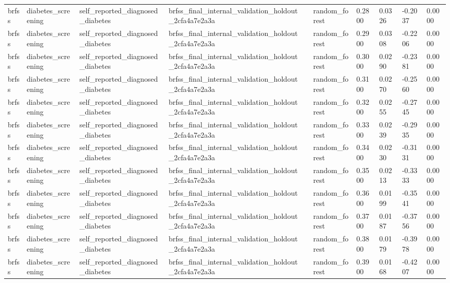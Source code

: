 \begin{tabular}{llllllllll}
brfss & diabetes\_screening & self\_reported\_diagnosed\_diabetes & brfss\_final\_internal\_validation\_holdout\_2cfa4a7e2a3a &  & random\_forest & 0.2800 & 0.0326 & -0.2037 & 0.0000 \\
brfss & diabetes\_screening & self\_reported\_diagnosed\_diabetes & brfss\_final\_internal\_validation\_holdout\_2cfa4a7e2a3a &  & random\_forest & 0.2900 & 0.0308 & -0.2206 & 0.0000 \\
brfss & diabetes\_screening & self\_reported\_diagnosed\_diabetes & brfss\_final\_internal\_validation\_holdout\_2cfa4a7e2a3a &  & random\_forest & 0.3000 & 0.0290 & -0.2381 & 0.0000 \\
brfss & diabetes\_screening & self\_reported\_diagnosed\_diabetes & brfss\_final\_internal\_validation\_holdout\_2cfa4a7e2a3a &  & random\_forest & 0.3100 & 0.0270 & -0.2560 & 0.0000 \\
brfss & diabetes\_screening & self\_reported\_diagnosed\_diabetes & brfss\_final\_internal\_validation\_holdout\_2cfa4a7e2a3a &  & random\_forest & 0.3200 & 0.0255 & -0.2745 & 0.0000 \\
brfss & diabetes\_screening & self\_reported\_diagnosed\_diabetes & brfss\_final\_internal\_validation\_holdout\_2cfa4a7e2a3a &  & random\_forest & 0.3300 & 0.0239 & -0.2935 & 0.0000 \\
brfss & diabetes\_screening & self\_reported\_diagnosed\_diabetes & brfss\_final\_internal\_validation\_holdout\_2cfa4a7e2a3a &  & random\_forest & 0.3400 & 0.0230 & -0.3131 & 0.0000 \\
brfss & diabetes\_screening & self\_reported\_diagnosed\_diabetes & brfss\_final\_internal\_validation\_holdout\_2cfa4a7e2a3a &  & random\_forest & 0.3500 & 0.0213 & -0.3333 & 0.0000 \\
brfss & diabetes\_screening & self\_reported\_diagnosed\_diabetes & brfss\_final\_internal\_validation\_holdout\_2cfa4a7e2a3a &  & random\_forest & 0.3600 & 0.0199 & -0.3541 & 0.0000 \\
brfss & diabetes\_screening & self\_reported\_diagnosed\_diabetes & brfss\_final\_internal\_validation\_holdout\_2cfa4a7e2a3a &  & random\_forest & 0.3700 & 0.0187 & -0.3756 & 0.0000 \\
brfss & diabetes\_screening & self\_reported\_diagnosed\_diabetes & brfss\_final\_internal\_validation\_holdout\_2cfa4a7e2a3a &  & random\_forest & 0.3800 & 0.0179 & -0.3978 & 0.0000 \\
brfss & diabetes\_screening & self\_reported\_diagnosed\_diabetes & brfss\_final\_internal\_validation\_holdout\_2cfa4a7e2a3a &  & random\_forest & 0.3900 & 0.0168 & -0.4207 & 0.0000 \\

\end{tabular}

